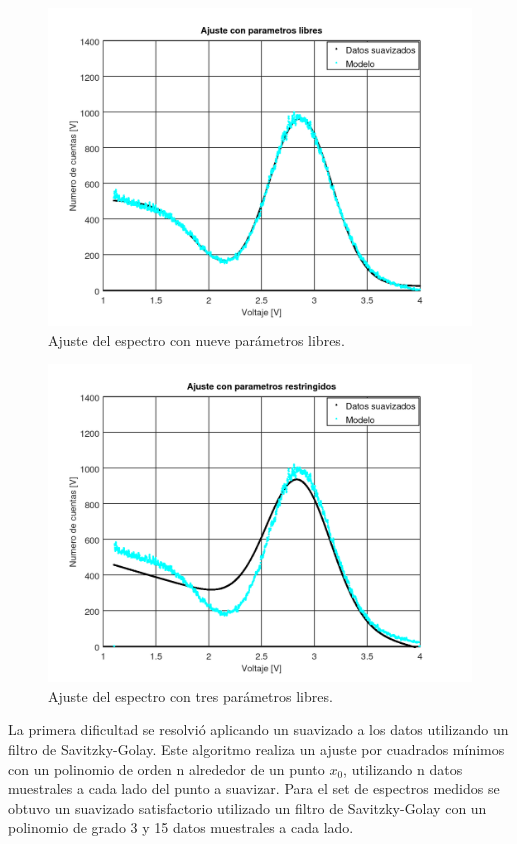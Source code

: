 \documentclass[twoside]{article}
\begin{document}
\begin{multicols}{2}
\begin{figure}[H]
    \centering
    \includegraphics[scale=0.4]{ajustelindo.png}
    \caption{Ajuste del espectro con nueve parámetros libres.}
    \label{ajustelindo}
\end{figure}


\begin{figure}[H]
    \centering
    \includegraphics[scale=0.4]{ajustefeo.png}
    \caption{Ajuste del espectro con tres parámetros libres.}
    \label{ajustefeo}
\end{figure}


La primera dificultad se resolvió aplicando un suavizado a los datos utilizando un filtro de Savitzky-Golay\cite{Savitzky-Golay}. Este algoritmo realiza un ajuste por cuadrados mínimos con un polinomio de orden n alrededor de un punto ${x_0}$, utilizando n datos muestrales a cada lado del punto a suavizar. Para el set de espectros medidos se obtuvo un suavizado satisfactorio utilizado un filtro de Savitzky-Golay con un polinomio de grado 3 y 15 datos muestrales a cada lado.


\end{multicols}
\end{document}
